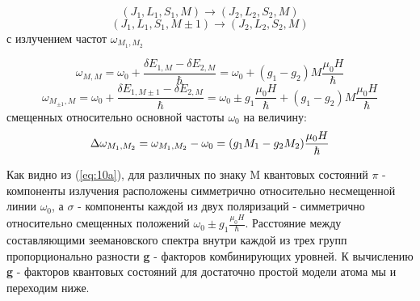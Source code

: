 $$(J_{1},L_{1},S_{1},M)\rightarrow(J_{2},L_{2},S_{2},M)$$
$$(J_{1},L_{1},S_{1},M \pm1)\rightarrow(J_{2},L_{2},S_{2},M)$$
с излучением частот $\omega_{M_1,M_2}$

\begin{equation} \tag{10a}
	\omega_{M,M}= \omega_0 + \frac{\delta E_{1,M} - \delta E_{2,M}}{\hbar} = \omega_0 + (g_1 - g_2)M\frac{\mu_0 H}{\hbar} 
	\label{eq:10a} 
\end{equation}
\begin{equation} \tag{10b}
	\omega_{M_{\pm1},M}=\omega_0 + \frac{\delta E_{1,M\pm1} - \delta E_{2,M}}{\hbar} = \omega_0 \pm g_1 \frac {\mu_0 H}{\hbar} +(g_1 - g_2)M\frac{\mu_0 H}{\hbar} 
	\label{eq:10b} 
\end{equation}
смещенных относительно основной частоты $\omega_0$ на величину:
	\begin{equation}
	\addtocounter{equation}{1}
	\Delta \omega_{M_1,M_2} = \omega_{M_1,M_2} - \omega_{0} = (g_{1} M_{1} - g_{2} M_{2})\frac{\mu_{0} H}{\hbar}
	\label{eq:11} 
\end{equation}

Как видно из (\ref{eq:10a}), для различных по знаку M квантовых состояний $\pi$ - компоненты излучения расположены симметрично относительно несмещенной линии $\omega_0$, а $\sigma$ - компоненты каждой из двух поляризаций - симметрично относительно смещенных положений $\omega_0 \pm g_{1} \frac{\mu_{0} H}{\hbar}$. Расстояние между составляющими зеемановского спектра внутри каждой из трех групп пропорционально разности \textbf{g} - факторов комбинирующих уровней. К вычислению \textbf{g} - факторов квантовых состояний для достаточно простой модели атома мы и переходим ниже.



% 